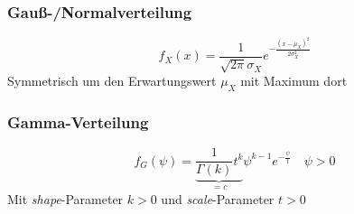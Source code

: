 \begin{sectionbox}
    \subsubsection{Gauß-/Normalverteilung}
    \begin{equation*}
        f_X(x) = \frac{1}{\sqrt{2\pi}\sigma_X}e^{-\frac{(x-\mu_X)^2}{2\sigma_X^2}}
    \end{equation*}
    Symmetrisch um den Erwartungswert $\mu_X$ mit Maximum dort
\end{sectionbox}

\begin{sectionbox}
    \subsubsection{Gamma-Verteilung}
    \begin{equation*}
        f_G(\psi) = \underbrace{\frac{1}{\Gamma(k)}t^k}_{=c}\psi^{k-1}e^{-\frac{\psi}{t}} \quad \psi > 0
    \end{equation*}
    Mit \textit{shape}-Parameter $k>0$ und \textit{scale}-Parameter $t>0$
\end{sectionbox}